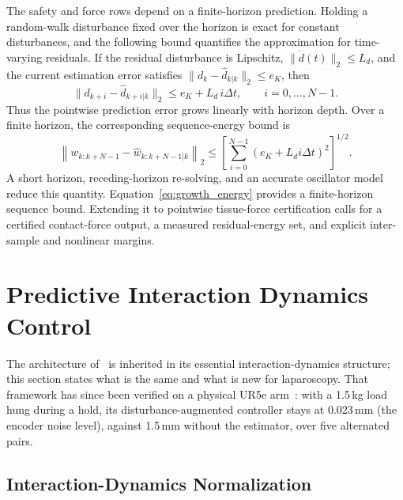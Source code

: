 The safety and force rows depend on a finite-horizon prediction. Holding a random-walk disturbance fixed over the horizon is exact for constant disturbances, and the following bound quantifies the approximation for time-varying residuals. If the residual disturbance is Lipschitz, $\|\dot d(t)\|_2\le L_d$, and the current estimation error satisfies $\|d_k-\hat d_{k|k}\|_2\le e_K$, then
\begin{equation}
\|d_{k+i}-\hat d_{k+i|k}\|_2 \le e_K+L_d\,i\Delta t,\qquad i=0,\ldots,N-1.
\label{eq:growth}
\end{equation}
Thus the pointwise prediction error grows linearly with horizon depth. Over a finite horizon, the corresponding sequence-energy bound is
\begin{equation}
\left\|w_{k:k+N-1}-\hat w_{k:k+N-1|k}\right\|_2
\le
\left[\sum_{i=0}^{N-1}\left(e_K+L_di\Delta t\right)^2\right]^{1/2}.
\label{eq:growth_energy}
\end{equation}
A short horizon, receding-horizon re-solving, and an accurate oscillator model reduce this quantity. Equation~\eqref{eq:growth_energy} provides a finite-horizon sequence bound. Extending it to pointwise tissue-force certification calls for a certified contact-force output, a measured residual-energy set, and explicit inter-sample and nonlinear margins.

\section{Predictive Interaction Dynamics Control}\label{sec:mpc}

The architecture of~\cite{cao2026phri} is inherited in its essential interaction-dynamics structure; this section states what is the same and what is new for laparoscopy. That framework has since been verified on a physical UR5e arm~\cite{cao2026phri}: with a 1.5\,kg load hung during a hold, its disturbance-augmented controller stays at 0.023\,mm (the encoder noise level), against 1.5\,mm without the estimator, over five alternated pairs.

\subsection{Interaction-Dynamics Normalization}

